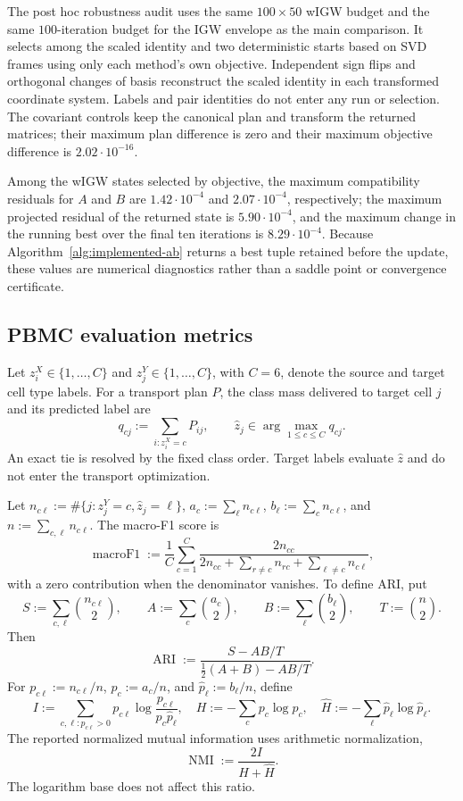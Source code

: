 \documentclass[11pt]{article}
\theoremstyle{plain}
\theoremstyle{definition}
\theoremstyle{remark}
\begin{document}
The post hoc robustness audit uses the same \(100\times50\) wIGW budget and
the same \(100\)-iteration budget for the IGW envelope as the main comparison. It
selects among the scaled identity and two deterministic starts based on SVD frames
using only each method's own objective. Independent sign flips and orthogonal changes
of basis reconstruct the scaled
identity in each transformed coordinate system. Labels and pair identities do not
enter any run or selection. The covariant controls keep the canonical plan and
transform the returned matrices; their maximum plan difference is zero and their
maximum objective difference is \(2.02\cdot10^{-16}\).
\par{}\noindent
Among the wIGW states selected by objective, the maximum compatibility residuals for
\(A\) and \(B\) are
\(1.42\cdot10^{-4}\) and \(2.07\cdot10^{-4}\), respectively; the maximum projected
residual of the returned state is \(5.90\cdot10^{-4}\), and the maximum change in the running best over the
final ten iterations is \(8.29\cdot10^{-4}\). Because Algorithm~\ref{alg:implemented-ab}
returns a best tuple retained before the update, these values are numerical diagnostics
rather than a saddle point or convergence certificate.

\FloatBarrier

\subsection{PBMC evaluation metrics}\label{subsec:pbmc-evaluation-metrics}

Let \(z_i^X\in\{1,\ldots,C\}\) and \(z_j^Y\in\{1,\ldots,C\}\), with
\(C=6\), denote the source and target cell type labels. For a transport plan
\(P\), the class mass delivered to target cell \(j\) and its predicted label are
\[
 q_{cj}:=\sum_{i:z_i^X=c}P_{ij},
 \qquad
 \widehat z_j\in\arg\max_{1\le c\le C}q_{cj}.
\]
An exact tie is resolved by the fixed class order. Target labels evaluate
\(\widehat z\) and do not enter the transport optimization.

Let
\(n_{c\ell}:=\#\{j:z_j^Y=c,\widehat z_j=\ell\}\),
\(a_c:=\sum_\ell n_{c\ell}\),
\(b_\ell:=\sum_c n_{c\ell}\), and
\(n:=\sum_{c,\ell}n_{c\ell}\). The macro-F1 score is
\[
 \operatorname{macroF1}
 :=\frac1C\sum_{c=1}^C
 \frac{2n_{cc}}
 {2n_{cc}+\sum_{r\ne c}n_{rc}+\sum_{\ell\ne c}n_{c\ell}},
\]
with a zero contribution when the denominator vanishes. To define ARI, put
\[
 S:=\sum_{c,\ell}\binom{n_{c\ell}}2,
 \qquad A:=\sum_c\binom{a_c}2,
 \qquad B:=\sum_\ell\binom{b_\ell}2,
 \qquad T:=\binom n2.
\]
Then
\[
 \operatorname{ARI}
 :=\frac{S-AB/T}{\tfrac12(A+B)-AB/T}.
\]
For \(p_{c\ell}:=n_{c\ell}/n\), \(p_c:=a_c/n\), and
\(\widehat p_\ell:=b_\ell/n\), define
\[
 I:=\sum_{c,\ell:p_{c\ell}>0}p_{c\ell}
       \log\frac{p_{c\ell}}{p_c\widehat p_\ell},
 \quad
 H:=-\sum_c p_c\log p_c,
 \quad
 \widehat H:=-\sum_\ell\widehat p_\ell\log\widehat p_\ell.
\]
The reported normalized mutual information uses arithmetic normalization,
\[
 \operatorname{NMI}:=\frac{2I}{H+\widehat H}.
\]
The logarithm base does not affect this ratio.
\end{document}
